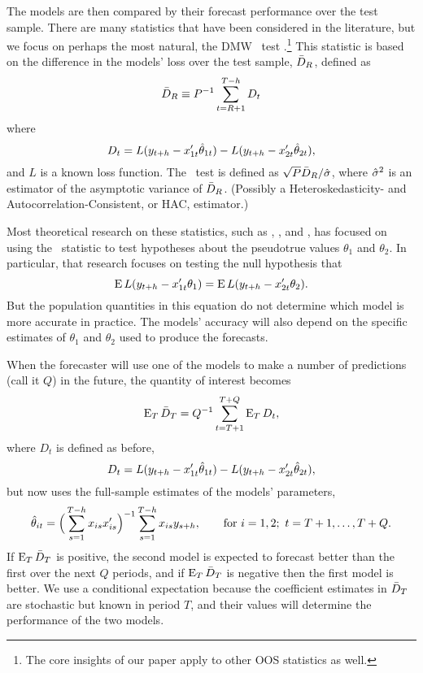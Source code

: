 \documentclass[12pt,draft]{article}
\begin{document}
The models are then compared by their forecast performance over the test
sample. There are many statistics that have been considered in the
literature, but we focus on perhaps the most natural, the DMW \oost\
test \citep{DiM:95,Wes:96}.\footnote{%
  The core insights of our paper apply to other OOS statistics as
  well.} %
This statistic is based on
the difference in the models' loss over the test sample, $\bar{D}_{R}$,
defined as
\begin{equation*}
  \bar{D}_{R} \equiv P^{-1} \sum_{t=R+1}^{T-h} D_t
\end{equation*}
where
\begin{equation*}
  D_t = L(y_{t+h} - x_{1t}'\hat\theta_{1t}) - L(y_{t+h} - x_{2t}'\hat\theta_{2t}),
\end{equation*}
and $L$ is a known loss function. The \oost\ test is defined as
$\sqrt{P} \bar{D}_{R} / \hat{\sigma}$, where $\hat{\sigma}^2$ is an estimator of the
asymptotic variance of $\bar{D}_{R}$. (Possibly a Heteroskedasticity- and
Autocorrelation-Consistent, or HAC, estimator.)

Most theoretical research on these statistics, such as \citet{DiM:95}, \citet{Wes:96},
and \cite{Mcc:07}, has focused on using the \oost\ statistic to test
hypotheses about the pseudotrue values $\theta_1$ and $\theta_2$.  In
particular, that research focuses on testing the null hypothesis that
\begin{equation*}
  \operatorname{E} L(y_{t+h} - x_{1t}'\theta_{1}) = \operatorname{E} L(y_{t+h} - x_{2t}'\theta_{2}).
\end{equation*}
But the population quantities in this equation do not determine which
model is more accurate in practice. The models'
accuracy will also depend on the specific estimates of $\theta_1$ and
$\theta_2$ used to produce the forecasts.

When the forecaster will use one of the models to make a number of
predictions (call it $Q$) in the future, the quantity of interest
becomes
\begin{equation*}
  \operatorname{E}_T \bar{D}_{T} = Q^{-1} \sum_{t=T+1}^{T+Q} \operatorname{E}_T D_t,
\end{equation*}
where $D_t$ is defined as before,
\begin{equation*}
  D_t = L(y_{t+h} - x_{1t}'\hat\theta_{1t}) - L(y_{t+h} - x_{2t}'\hat\theta_{2t}),
\end{equation*}
but now uses the full-sample estimates of the models' parameters,
\begin{equation*}
  \hat\theta_{it} = \Big(\sum_{s=1}^{T-h} x_{is}x_{is}'\Big)^{-1} \sum_{s=1}^{T-h}
  x_{is} y_{s+h}, \qquad \text{for } i=1,2;\ t = T+1,\dots, T + Q.
\end{equation*}
If $\operatorname{E}_T \bar{D}_{T}$ is positive, the second model is expected to forecast
better than the first over the next $Q$ periods, and if $\operatorname{E}_T \bar{D}_{T}$
is negative then the first model is better. We use a conditional
expectation because the coefficient estimates in $\bar{D}_{T}$ are
stochastic but known in period $T$, and their values will determine
the performance of the two models.
\end{document}
